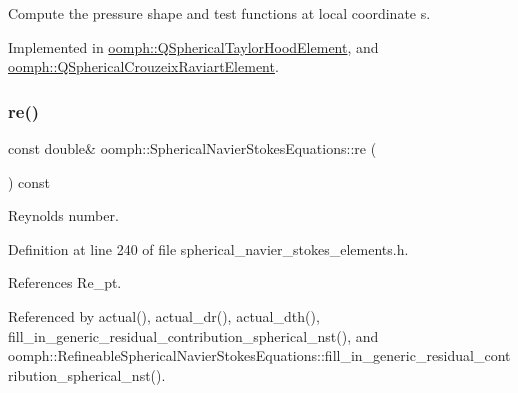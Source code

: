 Compute the pressure shape and test functions at local coordinate s. 



Implemented in \hyperlink{classoomph_1_1QSphericalTaylorHoodElement_afa1ec3d14dbdee7581260678f6790fe7}{oomph\+::\+Q\+Spherical\+Taylor\+Hood\+Element}, and \hyperlink{classoomph_1_1QSphericalCrouzeixRaviartElement_a25604ebbfd2720a969f2c3b6670d0d9c}{oomph\+::\+Q\+Spherical\+Crouzeix\+Raviart\+Element}.

\mbox{\label{classoomph_1_1SphericalNavierStokesEquations_a339dc121adc8a2eb62805ac63171fd6c}} 
\subsubsection{\texorpdfstring{re()}{re()}}
{\footnotesize\ttfamily const double\& oomph\+::\+Spherical\+Navier\+Stokes\+Equations\+::re (\begin{DoxyParamCaption}{ }\end{DoxyParamCaption}) const\hspace{0.3cm}{\ttfamily [inline]}}



Reynolds number. 



Definition at line 240 of file spherical\+\_\+navier\+\_\+stokes\+\_\+elements.\+h.



References Re\+\_\+pt.



Referenced by actual(), actual\+\_\+dr(), actual\+\_\+dth(), fill\+\_\+in\+\_\+generic\+\_\+residual\+\_\+contribution\+\_\+spherical\+\_\+nst(), and oomph\+::\+Refineable\+Spherical\+Navier\+Stokes\+Equations\+::fill\+\_\+in\+\_\+generic\+\_\+residual\+\_\+contribution\+\_\+spherical\+\_\+nst().

\mbox{\label{classoomph_1_1SphericalNavierStokesEquations_a80f09fb11edfdaa7bb1b262cd6dc9399}} 
